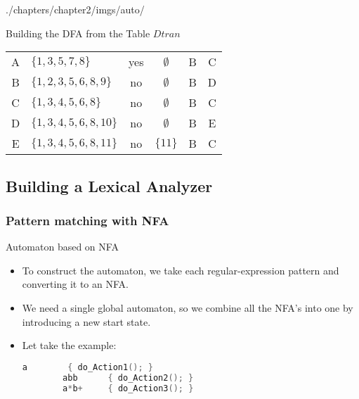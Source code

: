 \begin{graphicspathcontext}{{./chapters/chapter2/imgs/auto/}}
\begin{bibunit}[apalike]
\begin{frame}{Building the DFA from the Table $Dtran$}
	\vspace{1em}
	\begin{scriptsize}
	\begin{tabularx}{\linewidth}{|c|X|c|c|c|c|}
		\hline
		\tabularheading\chead{Label}&\chead{$Dstates$}&\chead{Init.}&\chead{Final}&\chead{\texttt{"a"}}&\chead{\texttt{"b"}}\\
		\hline
		A & $\{1,3,5,7,8\}$ & yes & $\emptyset$ & B & C \\\hline
		B & $\{1,2,3,5,6,8,9\}$ & no & $\emptyset$ & B & D \\\hline
		C & $\{1,3,4,5,6,8\}$ & no & $\emptyset$ & B & C \\\hline
		D & $\{1,3,4,5,6,8,10\}$ & no & $\emptyset$ & B & E \\\hline
		E & $\{1,3,4,5,6,8,11\}$ & no & $\{11\}$ & B & C \\\hline
	\end{tabularx}
	\end{scriptsize}
	\vfill
	\begin{center}
	\end{center}
\end{frame}

\subsection{Building a Lexical Analyzer}

\tableofcontentslide[sections={1-5},sectionstyle={show/shaded},subsectionstyle={show/shaded/hide},subsubsectionstyle={show/show/hide/hide}]

\subsubsection{Pattern matching with NFA}

\begin{frame}[fragile]{Automaton based on NFA}
	\begin{itemize}
	\item To construct the automaton, we take each regular-expression pattern and converting it to an NFA.
	\vfill
	\item We need a single global automaton, so we combine all the NFA's into one by introducing a new start state.
	\vfill
	\item Let take the example:
		\begin{lstlisting}[language=C,basicstyle={\normalsize}]
		a        { do_Action1(); }
		abb      { do_Action2(); }
		a*b+     { do_Action3(); }
		\end{lstlisting}
	\end{itemize}
\end{frame}


\end{bibunit}
\end{graphicspathcontext}
